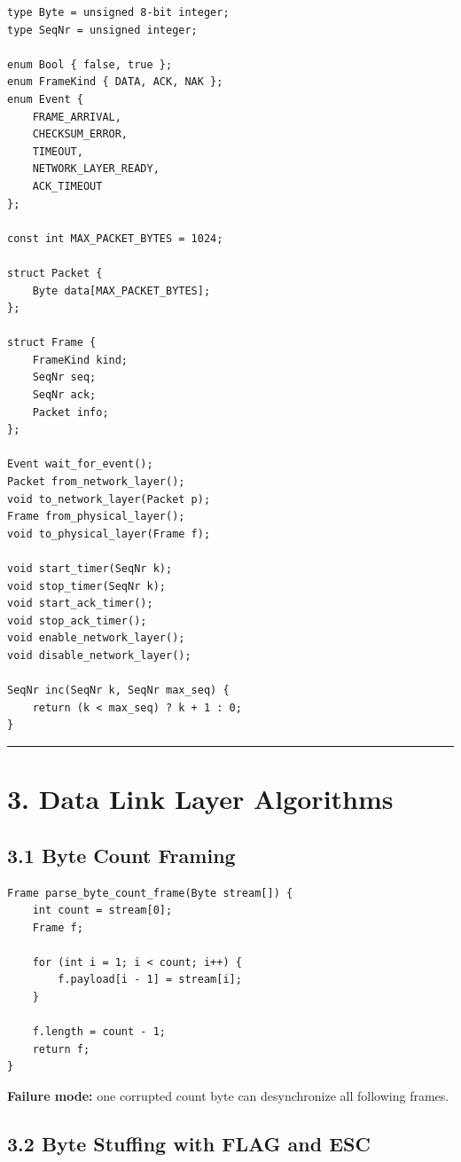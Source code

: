 \documentclass[11pt]{article}
\begin{document}
\begin{verbatim}
type Byte = unsigned 8-bit integer;
type SeqNr = unsigned integer;

enum Bool { false, true };
enum FrameKind { DATA, ACK, NAK };
enum Event {
    FRAME_ARRIVAL,
    CHECKSUM_ERROR,
    TIMEOUT,
    NETWORK_LAYER_READY,
    ACK_TIMEOUT
};

const int MAX_PACKET_BYTES = 1024;

struct Packet {
    Byte data[MAX_PACKET_BYTES];
};

struct Frame {
    FrameKind kind;
    SeqNr seq;
    SeqNr ack;
    Packet info;
};

Event wait_for_event();
Packet from_network_layer();
void to_network_layer(Packet p);
Frame from_physical_layer();
void to_physical_layer(Frame f);

void start_timer(SeqNr k);
void stop_timer(SeqNr k);
void start_ack_timer();
void stop_ack_timer();
void enable_network_layer();
void disable_network_layer();

SeqNr inc(SeqNr k, SeqNr max_seq) {
    return (k < max_seq) ? k + 1 : 0;
}
\end{verbatim}

\begin{center}\rule{0.5\linewidth}{0.5pt}\end{center}

\section{3. Data Link Layer
Algorithms}\label{data-link-layer-algorithms}

\subsection{3.1 Byte Count Framing}\label{byte-count-framing}

\begin{verbatim}
Frame parse_byte_count_frame(Byte stream[]) {
    int count = stream[0];
    Frame f;

    for (int i = 1; i < count; i++) {
        f.payload[i - 1] = stream[i];
    }

    f.length = count - 1;
    return f;
}
\end{verbatim}

\textbf{Failure mode:} one corrupted count byte can desynchronize all
following frames.

\subsection{3.2 Byte Stuffing with FLAG and
ESC}\label{byte-stuffing-with-flag-and-esc}
\end{document}
